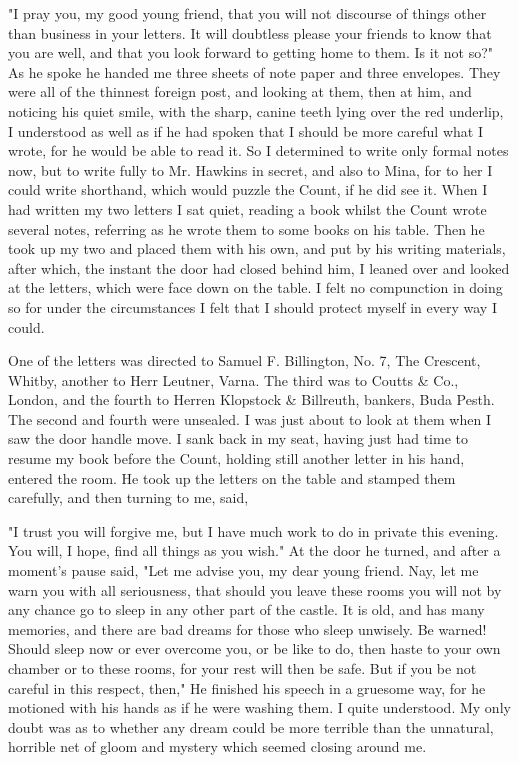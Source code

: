 "I pray you, my good young friend, that you will not discourse of things other than business in your letters. It will doubtless please your friends to know that you are well, and that you look forward to getting home to them. Is it not so?" As he spoke he handed me three sheets of note paper and three envelopes. They were all of the thinnest foreign post, and looking at them, then at him, and noticing his quiet smile, with the sharp, canine teeth lying over the red underlip, I understood as well as if he had spoken that I should be more careful what I wrote, for he would be able to read it. So I determined to write only formal notes now, but to write fully to Mr. Hawkins in secret, and also to Mina, for to her I could write shorthand, which would puzzle the Count, if he did see it. When I had written my two letters I sat quiet, reading a book whilst the Count wrote several notes, referring as he wrote them to some books on his table. Then he took up my two and placed them with his own, and put by his writing materials, after which, the instant the door had closed behind him, I leaned over and looked at the letters, which were face down on the table. I felt no compunction in doing so for under the circumstances I felt that I should protect myself in every way I could. 

One of the letters was directed to Samuel F. Billington, No. 7, The Crescent, Whitby, another to Herr Leutner, Varna. The third was to Coutts \& Co., London, and the fourth to Herren Klopstock \& Billreuth, bankers, Buda Pesth. The second and fourth were unsealed. I was just about to look at them when I saw the door handle move. I sank back in my seat, having just had time to resume my book before the Count, holding still another letter in his hand, entered the room. He took up the letters on the table and stamped them carefully, and then turning to me, said, 

"I trust you will forgive me, but I have much work to do in private this evening. You will, I hope, find all things as you wish." At the door he turned, and after a moment's pause said, "Let me advise you, my dear young friend. Nay, let me warn you with all seriousness, that should you leave these rooms you will not by any chance go to sleep in any other part of the castle. It is old, and has many memories, and there are bad dreams for those who sleep unwisely. Be warned! Should sleep now or ever overcome you, or be like to do, then haste to your own chamber or to these rooms, for your rest will then be safe. But if you be not careful in this respect, then," He finished his speech in a gruesome way, for he motioned with his hands as if he were washing them. I quite understood. My only doubt was as to whether any dream could be more terrible than the unnatural, horrible net of gloom and mystery which seemed closing around me. 


